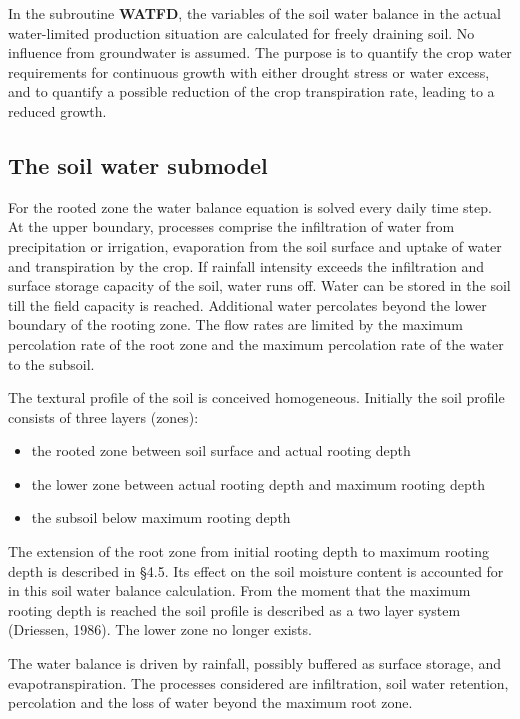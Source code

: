 In the subroutine {\bf WATFD}, the variables of the soil water balance in the actual 
water-limited produc\-tion situation are calculated for freely draining soil. No influence from
groundwater is assumed. The purpose is to quantify the crop water requirements for
continuous growth with either drought stress or water excess, and to quantify a possible
reduction of the crop transpiration rate, leading to a reduced growth.

\subsection{The soil water submodel}

For the rooted zone the water balance equation is solved every daily time step. At the
upper boundary, processes comprise the infiltration of water from precipitation or
irrigation, evaporation from the soil surface and uptake of water and transpiration by the
crop. If rainfall intensity exceeds the infiltration and surface storage capacity of the soil,
water runs off. Water can be stored in the soil till the field capacity is reached. Additional
water percolates beyond the lower boundary of the rooting zone.
The flow rates are limited by the maximum percolation rate of the root zone and the
maximum percolation rate of the water to the subsoil.

The textural profile of the soil is conceived homogeneous. Initially the soil profile
consists of three layers (zones):
\begin{itemize}
\item the rooted zone between soil surface and actual rooting depth
\item the lower zone between actual rooting depth and maximum rooting depth
\item the subsoil below maximum rooting depth
\end{itemize}

The extension of the root zone from initial rooting depth to maximum rooting depth is
described in \S 4.5. Its effect on the soil moisture content is accounted for in this soil water
balance calculation. From the moment that the maximum rooting depth is reached the soil
profile is described as a two layer system (Driessen, 1986). The lower zone no longer
exists.

The water balance is driven by rainfall, possibly buffered as surface storage, and
evapotranspiration. The processes considered are infiltration, soil water retention,
percolation and the loss of water beyond the maximum root zone.

